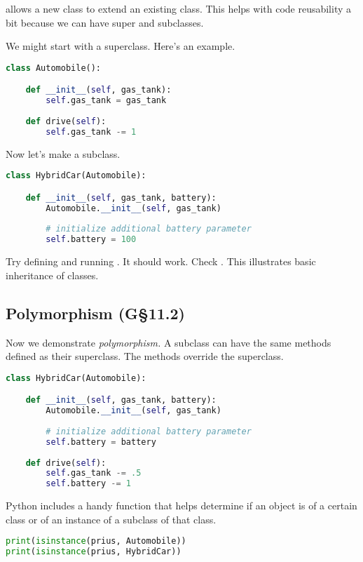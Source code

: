  allows a new class to extend an existing class. This helps with code reusability a bit because we can have super and subclasses. 

We might start with a superclass. Here's an example.

\begin{lstlisting}[language = Python]
class Automobile():

    def __init__(self, gas_tank):
        self.gas_tank = gas_tank
        
    def drive(self):
        self.gas_tank -= 1
\end{lstlisting}

Now let's make a subclass.
\begin{lstlisting}[language = Python]
class HybridCar(Automobile):

    def __init__(self, gas_tank, battery):
        Automobile.__init__(self, gas_tank)
        
        # initialize additional battery parameter
        self.battery = 100
\end{lstlisting}

Try defining  and running . It should work. Check . This illustrates basic inheritance of classes. 

\subsection{Polymorphism (G\S11.2)}
Now we demonstrate \emph{polymorphism.} A subclass can have the same methods defined as their superclass. The methods override the superclass. 

\begin{lstlisting}[language = Python]
class HybridCar(Automobile):

    def __init__(self, gas_tank, battery):
        Automobile.__init__(self, gas_tank)
        
        # initialize additional battery parameter
        self.battery = battery
        
    def drive(self):
        self.gas_tank -= .5
        self.battery -= 1
\end{lstlisting}

\smallskip
\noindent Python includes a handy  function that helps determine if an object is of a certain class or of an instance of a subclass of that class.

\begin{lstlisting}[language = Python]
print(isinstance(prius, Automobile))
print(isinstance(prius, HybridCar))
\end{lstlisting}